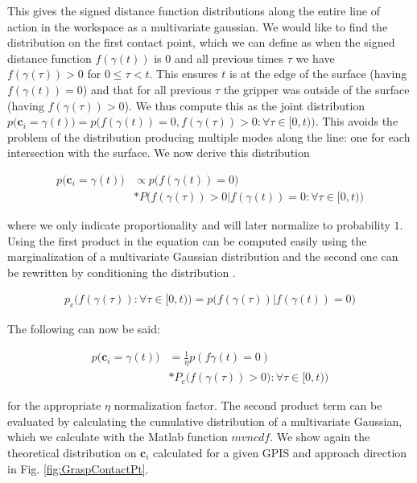 \documentclass[letterpaper, 10 pt, conference]{ieeeconf}  %
\begin{document}
This gives the signed distance function distributions along the entire line of action in the workspace as a multivariate gaussian.
We would like to find the distribution on the first contact point, which we can define as when the signed distance function $f(\gamma(t))$ is $0$ and all previous times $\tau$ we have $f(\gamma(\tau)) > 0$ for $0 \leq \tau < t$.
This ensures $t$ is at the edge of the surface (having $f(\gamma(t)) = 0$) and that for all previous $\tau$ the gripper was outside of the surface (having $f(\gamma(\tau)) > 0$).
We thus compute this as the joint distribution $p\big(\textbf{c}_i= \gamma(t)\big) = p\big(f(\gamma(t))=0, f(\gamma(\tau))> 0: \forall \tau \in [0,t)\big)$.
This avoids the problem of the distribution producing multiple modes along the line: one for each intersection with the surface.
We now derive this distribution 

\begin{align*}
p\big(\textbf{c}_i = \gamma(t)\big) &\propto p\big(f(\gamma(t)) = 0\big)\\
               &*P\big(f(\gamma(\tau)) > 0 | f(\gamma(t)) = 0: \forall \tau \in [0,t)\big)
\end{align*}

where we only indicate proportionality and will later normalize to probability $1$.
Using the first product in the equation can be computed easily using the marginalization of a multivariate Gaussian distribution and the second one can be rewritten by conditioning the distribution \cite{petersen2008matrix}. 

\begin{align*}
p_c\big(f(\gamma(\tau)): \forall \tau \in [0,t)\big) = p\big(f(\gamma(\tau))  | f(\gamma(t)) = 0\big)  
\end{align*}


The following can now be said:

\begin{align*}
p\big(\textbf{c}_i = \gamma(t)\big) &= \frac{1}{\eta} p(f\gamma(t) = 0) \\
				   &*P_c\big(f(\gamma(\tau)) > 0): \forall \tau \in [0,t)\big)			 
\end{align*} 

for the appropriate $\eta$ normalization factor.
The second product term can be evaluated by calculating the cumulative distribution of a multivariate Gaussian, which we calculate with the Matlab function $mvncdf$.
We show again the theoretical distribution on $\textbf{c}_i$ calculated for a given GPIS and approach direction in Fig.
\ref{fig:GraspContactPt}.
\end{document}
